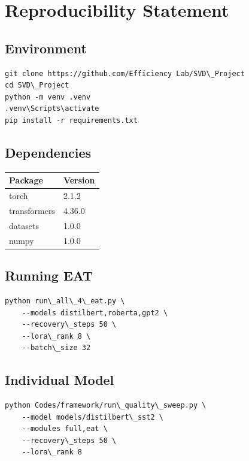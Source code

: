 
\section{Reproducibility Statement}

\subsection{Environment}

\begin{lstlisting}
git clone https://github.com/Efficiency Lab/SVD\_Project
cd SVD\_Project
python -m venv .venv
.venv\Scripts\activate
pip install -r requirements.txt
\end{lstlisting}

\subsection{Dependencies}

\begin{table}[H]
\centering
\small
\begin{tabular}{ll}
\toprule
\textbf{Package} & \textbf{Version} \\
\midrule
torch & 2.1.2 \\
transformers & 4.36.0 \\
datasets & 1.0.0 \\
numpy & 1.0.0 \\
\bottomrule
\end{tabular}
\end{table}

\subsection{Running EAT}

\begin{lstlisting}
python run\_all\_4\_eat.py \
    --models distilbert,roberta,gpt2 \
    --recovery\_steps 50 \
    --lora\_rank 8 \
    --batch\_size 32
\end{lstlisting}

\subsection{Individual Model}

\begin{lstlisting}
python Codes/framework/run\_quality\_sweep.py \
    --model models/distilbert\_sst2 \
    --modules full,eat \
    --recovery\_steps 50 \
    --lora\_rank 8
\end{lstlisting}

